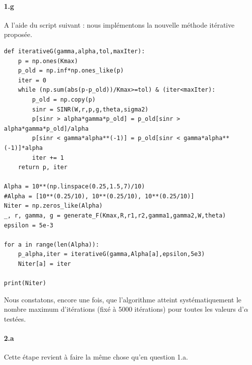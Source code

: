 \documentclass[a4paper,11pt,2]{article}
\begin{document}
\paragraph{1.g} A l'aide du script suivant : nous implémentons la nouvelle méthode itérative proposée.
\begin{center}
\begin{lstlisting}
def iterativeG(gamma,alpha,tol,maxIter):
    p = np.ones(Kmax)
    p_old = np.inf*np.ones_like(p)
    iter = 0
    while (np.sum(abs(p-p_old))/Kmax>=tol) & (iter<maxIter):
        p_old = np.copy(p)
        sinr = SINR(W,r,p,g,theta,sigma2)
        p[sinr > alpha*gamma*p_old] = p_old[sinr > alpha*gamma*p_old]/alpha
        p[sinr < gamma*alpha**(-1)] = p_old[sinr < gamma*alpha**(-1)]*alpha
        iter += 1
    return p, iter

Alpha = 10**(np.linspace(0.25,1.5,7)/10)
#Alpha = [10**(0.25/10), 10**(0.25/10), 10**(0.25/10)]
Niter = np.zeros_like(Alpha)
_, r, gamma, g = generate_F(Kmax,R,r1,r2,gamma1,gamma2,W,theta)
epsilon = 5e-3

for a in range(len(Alpha)):
    p_alpha,iter = iterativeG(gamma,Alpha[a],epsilon,5e3)
    Niter[a] = iter

print(Niter)
\end{lstlisting}
\end{center}

Nous constatons, encore une fois, que l'algorithme atteint systématiquement le nombre maximum d'itérations (fixé à 5000 itérations) pour toutes les valeurs d'$\alpha$ testées.

\paragraph{2.a} Cette étape revient à faire la même chose qu'en question 1.a.
\end{document}
